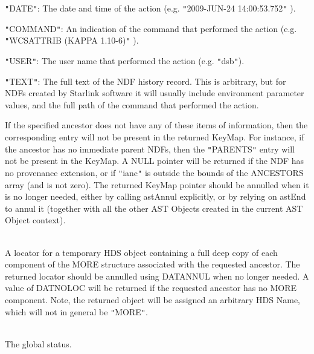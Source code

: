 \documentclass[twoside,11pt]{article}
\renewcommand{\_}{\texttt{\symbol{95}}}
\newcommand{\sstsubsection}[1]{ \item[{#1}] \mbox{} \\}
\newcommand{\sstitem}{\item}
\newcommand{\sstsubsection}[1]{\item[{#1}]}
\newcommand{\sstitem}{\item}
\begin{document}
{{{{            \sstitem
              {\tt "}DATE{\tt "}: The date and time of the action (e.g. {\tt "}2009-JUN-24
                14:00:53.752{\tt "} ).

            \sstitem
              {\tt "}COMMAND{\tt "}: An indication of the command that performed the
                action (e.g. {\tt "}WCSATTRIB (KAPPA 1.10-6){\tt "} ).

            \sstitem
              {\tt "}USER{\tt "}: The user name that performed the action (e.g. {\tt "}dsb{\tt "}).

            \sstitem
              {\tt "}TEXT{\tt "}: The full text of the NDF history record. This is
                arbitrary, but for NDFs created by Starlink software it will
                usually include environment parameter values, and the full
                path of the command that performed the action.

         }
         If the specified ancestor does not have any of these items of
         information, then the corresponding entry will not be present
         in the returned KeyMap. For instance, if the ancestor has no
         immediate parent NDFs, then the {\tt "}PARENTS{\tt "} entry will not be
         present in the KeyMap. A NULL pointer will be returned if the
         NDF has no provenance extension, or if {\tt "}ianc{\tt "} is outside the
         bounds of the ANCESTORS array (and is not zero). The returned
         KeyMap pointer should be annulled when it is no longer needed,
         either by calling astAnnul explicitly, or by relying on astEnd
         to annul it (together with all the other AST Objects created in
         the current AST Object context).
      }
      \sstsubsection{
         MORE = CHARACTER $*$ (DAT\_\_SZLOC) (Returned)
      }{
         A locator for a temporary HDS object containing a full deep copy
         of each component of the MORE structure associated with the
         requested ancestor. The returned locator should be annulled using
         DAT\_ANNUL when no longer needed. A value of DAT\_\_NOLOC will be
         returned if the requested ancestor has no MORE component. Note,
         the returned object will be assigned an arbitrary HDS Name, which
         will not in general be {\tt "}MORE{\tt "}.
      }
      \sstsubsection{
         STATUS = INTEGER (Given and Returned)
      }{
         The global status.
      }
   }
}
\end{document}
